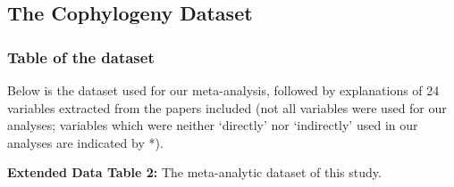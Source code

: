 \documentclass[
]{article}
\newenvironment{Shaded}{\begin{snugshade}}{\end{snugshade}}
\newcommand{\CommentTok}[1]{\textcolor[rgb]{0.56,0.35,0.01}{\textit{#1}}}
\newcommand{\DataTypeTok}[1]{\textcolor[rgb]{0.13,0.29,0.53}{#1}}
\newcommand{\KeywordTok}[1]{\textcolor[rgb]{0.13,0.29,0.53}{\textbf{#1}}}
\newcommand{\NormalTok}[1]{#1}
\newcommand{\OperatorTok}[1]{\textcolor[rgb]{0.81,0.36,0.00}{\textbf{#1}}}
\newcommand{\StringTok}[1]{\textcolor[rgb]{0.31,0.60,0.02}{#1}}
\begin{document}
\hypertarget{the-cophylogeny-dataset}{%
\subsection{The Cophylogeny Dataset}\label{the-cophylogeny-dataset}}

\hypertarget{table-of-the-dataset}{%
\subsubsection{Table of the dataset}\label{table-of-the-dataset}}

Below is the dataset used for our meta-analysis, followed by
explanations of 24 variables extracted from the papers included (not all
variables were used for our analyses; variables which were neither
`directly' nor `indirectly' used in our analyses are indicated by *).

\textbf{Extended Data Table 2:} The meta-analytic dataset of this study.

\begin{Shaded}
\end{Shaded}
\end{document}
